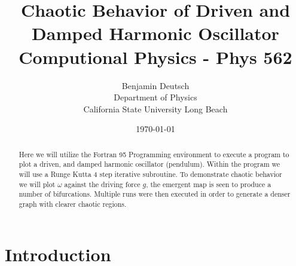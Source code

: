 \documentclass[12pt,letterpaper,notitlepage]{article}
\begin{document}




\title{%
	Chaotic Behavior of Driven and Damped Harmonic Oscillator  \\
\large Computional Physics - Phys 562}
\author{Benjamin Deutsch  \\
Department of Physics\\
California State University Long Beach}
\date{\today }

  
\maketitle



\begin{abstract}
Here we will utilize the Fortran 95 Programming environment to execute a program to plot a driven, and damped harmonic oscillator (pendulum). Within the program we will use a Runge Kutta 4 step iterative subroutine. To demonstrate chaotic behavior we will plot  $\omega$ against the driving force $g$, the emergent map is seen to produce a number of bifurcations. Multiple runs were then executed in order to generate a denser graph with clearer chaotic regions.        
\end{abstract}

\section{Introduction}
\end{document}
